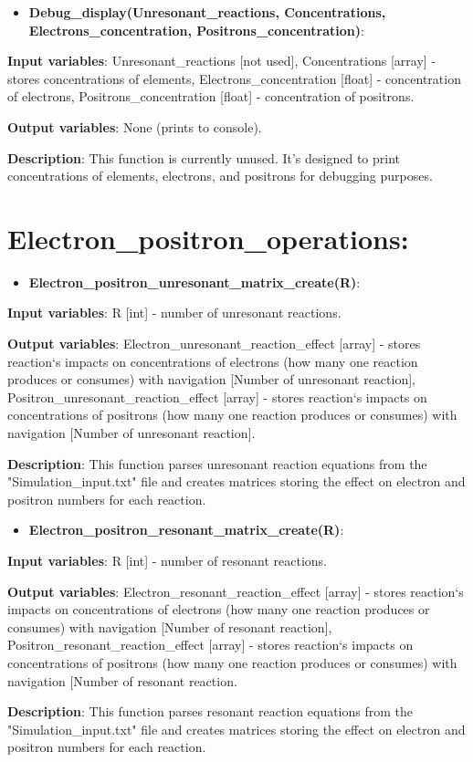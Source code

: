 \documentclass[a4paper,12pt]{article}
\newcommand{\namefunction}[4]{
  \begin{itemize}
    \item \textbf{#1}:
  \end{itemize}
  
  \textbf{Input variables}: #2.
  
  \textbf{Output variables}: #4.
  
  \textbf{Description}: #3.
}
\begin{document}
\vspace{1em}

\namefunction{Debug\_display(Unresonant\_reactions, Concentrations, Electrons\_concentration, Positrons\_concentration)}{Unresonant\_reactions [not used], Concentrations [array] - stores concentrations of elements, Electrons\_concentration [float] - concentration of electrons, Positrons\_concentration [float] - concentration of positrons}{This function is currently unused. It's designed to print concentrations of elements, electrons, and positrons for debugging purposes}{None (prints to console)}

\section{Electron\_positron\_operations:}

\vspace{1em}

\namefunction{Electron\_positron\_unresonant\_matrix\_create(R)}{R [int] - number of unresonant reactions}{This function parses unresonant reaction equations from the "Simulation\_input.txt" file and creates matrices storing the effect on electron and positron numbers for each reaction}{Electron\_unresonant\_reaction\_effect [array] - stores reaction`s  impacts on concentrations of electrons (how many one reaction produces or consumes) with navigation [Number of unresonant reaction], Positron\_unresonant\_reaction\_effect [array] - stores reaction`s  impacts on concentrations of positrons (how many one reaction produces or consumes) with navigation [Number of unresonant reaction]}

\vspace{1em}

\namefunction{Electron\_positron\_resonant\_matrix\_create(R)}{R [int] - number of resonant reactions}{This function parses resonant reaction equations from the "Simulation\_input.txt" file and creates matrices storing the effect on electron and positron numbers for each reaction}{Electron\_resonant\_reaction\_effect [array] - stores reaction`s  impacts on concentrations of electrons (how many one reaction produces or consumes) with navigation [Number of resonant reaction], Positron\_resonant\_reaction\_effect [array] - stores reaction`s  impacts on concentrations of positrons (how many one reaction produces or consumes) with navigation [Number of resonant reaction}

\vspace{1em}
\end{document}

